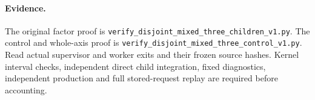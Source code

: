 \documentclass[11pt]{article}
\begin{document}
\paragraph{Evidence.}
The original factor proof is
\texttt{verify\_disjoint\_mixed\_three\_children\_v1.py}.
The control and whole-axis proof is
\texttt{verify\_disjoint\_mixed\_three\_control\_v1.py}.
Read actual supervisor and worker exits and their frozen source hashes.
Kernel interval checks, independent direct child integration, fixed diagnostics, independent production and full stored-request replay are required before accounting.
\end{document}
